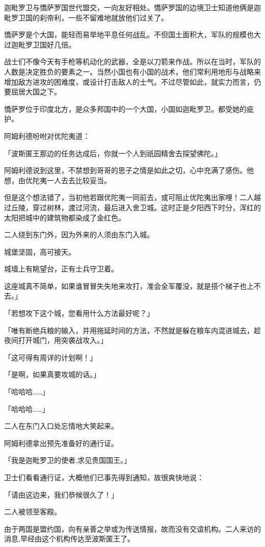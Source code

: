 \documentclass[twoside,openany]{book}
\begin{document}
迦毗罗卫与憍萨罗国世代盟交，一向友好相处。憍萨罗国的边境卫士知道他俩是迦毗罗卫国的刹帝利，一些不留难地就放他们过关了。

憍萨罗是个大国，能轻而易举地平息任何战乱。不但国土面积大，军队的规模也大过迦毗罗卫国好几倍。

战士们不像今天有手枪等机动化的武器，全是以刀箭来作战。所以在当时，军队的人数是决定胜负的要素之一。当然小国也有小国的战术，他们常利用地形与战略来增加敌方进攻的困难度，或设计打击敌人的士气。不过尽管如此，就实力而言，仍要屈居大国之下。

憍萨罗位于印度北方，是众多邦国中的一个大国，小国如迦毗罗卫。都受她的疵护。

阿姆利德吩咐对优陀夷道：

「波斯匿王那边的任务达成后，你就一个人到祇园精舍去探望佛陀。」

阿姆利德说到这里，不禁想到哥哥的思子之情是如此之切，心中充满了感伤。他想，由优陀夷一人去去比较妥当。

但是这个想法错了，当初他若跟优陀夷一同前去，或可阻止优陀夷出家哩！二人越过丘陵，穿过树林，渡过河流，最后进入舍卫城。这时正是夕阳西下时分，浑红的太阳把城中的建筑物都染成了金红色。

二人绕到东门外，因为外来的人须由东门入城。

城堡坚固，高可接天。

城墙上有眺望台，正有士兵守卫着。

这座城真不简单，如果谁冒冒失失地来攻打，准会全军覆没，就是搭个梯子也上不去。」

「若想攻下这个城，您看用什么方法最好呢？」

「唯有断绝兵粮的输入，并用拖延时间的方法，不然就是躲在粮车内混进城去，趁夜间打开城门，用突袭战攻入。」

「这可得有周详的计划啊！」

「是啊，如果真要攻城的话。」

「哈哈哈……」

「哈哈哈……」

二人在东门入口处忘情地大笑起来。

阿姆利德拿出预先准备好的通行证。

「我是迦毗罗卫的使者,求见贵国国王。」

卫士们看看通行证，大概他们已事先得到通知，故很爽快地说：

「请由这边来，我们恭候很久了！」

二人被领至客殿。

由于两国是盟约国，向有亲善之举或为传送情报，故而没有交谊机构。二人来访的消息,早经由这个机构传达至波斯匿王了。
\end{document}

